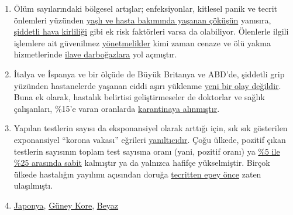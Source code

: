 \begin{enumerate}
{  değil 109} yaşındadır. Çocuklarda Kawasaki hastalığındaki artış bile
  \href{https://www.societi.org.uk/kawasaki-disease-covid-19/responding-to-press-coverage-28-april-2020/}{hatalı
  çıkmıştır}.
\item
  Ölüm sayılarındaki bölgesel artışlar; enfeksiyonlar, kitlesel panik ve
  tecrit önlemleri yüzünden
  \href{https://swprs.org/covid-19-a-report-from-italy/}{yaşlı ve hasta
  bakımında yaşanan çöküşün} yanısıra,
  \href{https://www.theguardian.com/environment/2020/apr/20/air-pollution-may-be-key-contributor-to-covid-19-deaths-study}{şiddetli
  hava kirliliği} gibi ek risk faktörleri varsa da olabiliyor. Ölenlerle
  ilgili işlemlere ait güvenilmez
  \href{https://www.ecdc.europa.eu/sites/default/files/documents/COVID-19-safe-handling-of-bodies-or-persons-dying-from-COVID19.pdf}{yönetmelikler}
  kimi zaman cenaze ve ölü yakma hizmetlerinde
  \href{https://www.globalresearch.ca/truth-behind-refrigerated-morgue-truck-stories/5711475}{ilave
  darboğazlara} yol açmıştır.
\item
  İtalya ve İspanya ve bir ölçüde de Büyük Britanya ve ABD'de, şiddetli
  grip yüzünden hastanelerde yaşanan ciddi aşırı yüklenme
  \href{https://off-guardian.org/2020/04/02/coronavirus-fact-check-1-flu-doesnt-overwhelm-our-hospitals/}{yeni
  bir olay değildir}. Buna ek olarak, hastalık belirtisi geliştirmeseler
  de doktorlar ve sağlık çalışanları, \%15'e varan oranlarda
  \href{https://www.nytimes.com/2020/03/24/world/europe/coronavirus-europe-covid-19.html}{karantinaya
  alınmıştır}.
\item
  Yapılan testlerin sayısı da eksponansiyel olarak arttığı için, sık sık
  gösterilen exponansiyel ``korona vakası'' eğrileri
  \href{https://fivethirtyeight.com/features/coronavirus-case-counts-are-meaningless/}{yanıltıcıdır}.
  Çoğu ülkede, pozitif çıkan testlerin sayısının toplam test sayısına
  oranı (yani, pozitif oranı) ya
  \href{https://swprs.org/rate-of-positive-covid19-tests/}{\%5 ile \%25
  arasında sabit} kalmıştır ya da yalnızca hafifçe yükselmiştir. Birçok
  ülkede hastalığın yayılımı açısından doruğa
  \href{https://www.dailymail.co.uk/news/article-8391141/Did-UKs-coronavirus-crisis-peak-lockdown.html}{tecritten
  epey önce} zaten ulaşılmıştı.
\item
  \href{https://www.bloomberg.com/news/articles/2020-05-22/did-japan-just-beat-the-virus-without-lockdowns-or-mass-testing}{Japonya},
  \href{https://www.businessinsider.com/south-korea-coronavirus-testing-death-rate-2020-3?op=1}{Güney
  Kore},
  \href{https://www.forbes.com/sites/jamesrodgerseurope/2020/04/04/in-belarus-lukashenko-has-his--own-ways-for-the-country-to-face-coronavirus/}{Beyaz
}
\end{enumerate}
